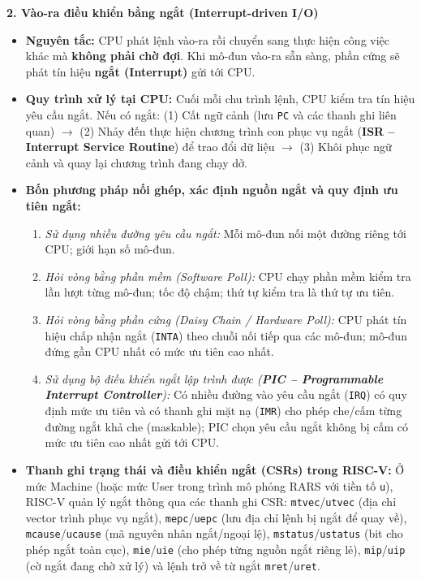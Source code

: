 \textbf{2. Vào-ra điều khiển bằng ngắt (Interrupt-driven I/O)}
\begin{itemize}
    \item \textbf{Nguyên tắc:} CPU phát lệnh vào-ra rồi chuyển sang thực hiện công việc khác mà \textbf{không phải chờ đợi}. Khi mô-đun vào-ra sẵn sàng, phần cứng sẽ phát tín hiệu \textbf{ngắt (Interrupt)} gửi tới CPU.
    \item \textbf{Quy trình xử lý tại CPU:} Cuối mỗi chu trình lệnh, CPU kiểm tra tín hiệu yêu cầu ngắt. Nếu có ngắt: (1) Cất ngữ cảnh (lưu \texttt{PC} và các thanh ghi liên quan) $\rightarrow$ (2) Nhảy đến thực hiện chương trình con phục vụ ngắt (\textbf{ISR -- Interrupt Service Routine}) để trao đổi dữ liệu $\rightarrow$ (3) Khôi phục ngữ cảnh và quay lại chương trình đang chạy dở.
    \item \textbf{Bốn phương pháp nối ghép, xác định nguồn ngắt và quy định ưu tiên ngắt:}
    \begin{enumerate}[label=\arabic*.]
        \item \textit{Sử dụng nhiều đường yêu cầu ngắt:} Mỗi mô-đun nối một đường riêng tới CPU; giới hạn số mô-đun.
        \item \textit{Hỏi vòng bằng phần mềm (Software Poll):} CPU chạy phần mềm kiểm tra lần lượt từng mô-đun; tốc độ chậm; thứ tự kiểm tra là thứ tự ưu tiên.
        \item \textit{Hỏi vòng bằng phần cứng (Daisy Chain / Hardware Poll):} CPU phát tín hiệu chấp nhận ngắt (\texttt{INTA}) theo chuỗi nối tiếp qua các mô-đun; mô-đun đứng gần CPU nhất có mức ưu tiên cao nhất.
        \item \textit{Sử dụng bộ điều khiển ngắt lập trình được (\textbf{PIC -- Programmable Interrupt Controller}):} Có nhiều đường vào yêu cầu ngắt (\texttt{IRQ}) có quy định mức ưu tiên và có thanh ghi mặt nạ (\texttt{IMR}) cho phép che/cấm từng đường ngắt khả che (maskable); PIC chọn yêu cầu ngắt không bị cấm có mức ưu tiên cao nhất gửi tới CPU.
    \end{enumerate}
    \item \textbf{Thanh ghi trạng thái và điều khiển ngắt (CSRs) trong RISC-V:} Ở mức Machine (hoặc mức User trong trình mô phỏng RARS với tiền tố \texttt{u}), RISC-V quản lý ngắt thông qua các thanh ghi CSR: \texttt{mtvec}/\texttt{utvec} (địa chỉ vector trình phục vụ ngắt), \texttt{mepc}/\texttt{uepc} (lưu địa chỉ lệnh bị ngắt để quay về), \texttt{mcause}/\texttt{ucause} (mã nguyên nhân ngắt/ngoại lệ), \texttt{mstatus}/\texttt{ustatus} (bit cho phép ngắt toàn cục), \texttt{mie}/\texttt{uie} (cho phép từng nguồn ngắt riêng lẻ), \texttt{mip}/\texttt{uip} (cờ ngắt đang chờ xử lý) và lệnh trở về từ ngắt \texttt{mret}/\texttt{uret}.
\end{itemize}

